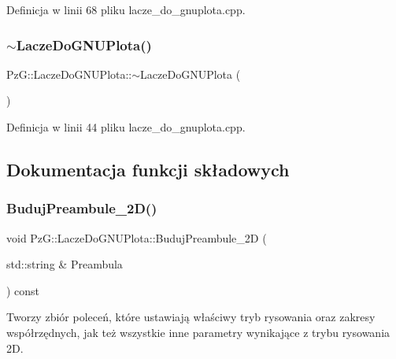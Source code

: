 Definicja w linii 68 pliku lacze\+\_\+do\+\_\+gnuplota.\+cpp.

\mbox{\label{class_pz_g_1_1_lacze_do_g_n_u_plota_afc10ec7f193032ecae714f6d832dcbf0}} 
\subsubsection{\texorpdfstring{$\sim$LaczeDoGNUPlota()}{~LaczeDoGNUPlota()}}
{\footnotesize\ttfamily Pz\+G\+::\+Lacze\+Do\+G\+N\+U\+Plota\+::$\sim$\+Lacze\+Do\+G\+N\+U\+Plota (\begin{DoxyParamCaption}{ }\end{DoxyParamCaption})\hspace{0.3cm}{\ttfamily [virtual]}}



Definicja w linii 44 pliku lacze\+\_\+do\+\_\+gnuplota.\+cpp.



\subsection{Dokumentacja funkcji składowych}
\mbox{\label{class_pz_g_1_1_lacze_do_g_n_u_plota_a0ac655ff1934abb69ea668cd92ae77ec}} 
\subsubsection{\texorpdfstring{BudujPreambule\_2D()}{BudujPreambule\_2D()}}
{\footnotesize\ttfamily void Pz\+G\+::\+Lacze\+Do\+G\+N\+U\+Plota\+::\+Buduj\+Preambule\+\_\+2D (\begin{DoxyParamCaption}\item[{std\+::string \&}]{Preambula }\end{DoxyParamCaption}) const\hspace{0.3cm}{\ttfamily [protected]}}

Tworzy zbiór poleceń, które ustawiają właściwy tryb rysowania oraz zakresy współrzędnych, jak też wszystkie inne parametry wynikające z trybu rysowania 2D. 

